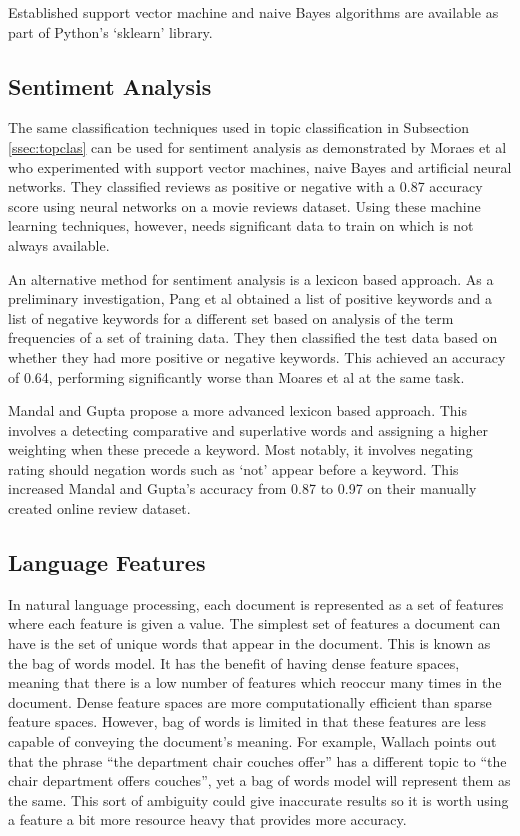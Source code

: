 			Established support vector machine and naive Bayes algorithms are available as part of Python's `sklearn' library.
		\subsection{Sentiment Analysis}
			The same classification techniques used in topic classification in Subsection \ref{ssec:topclas} can be used for sentiment analysis as demonstrated by Moraes et al who experimented with support vector machines, naive Bayes and artificial neural networks. They classified reviews as positive or negative with a 0.87 accuracy score using neural networks on a movie reviews dataset\cite{sentiment_ann_moares}. Using these machine learning techniques, however, needs significant data to train on which is not always available. 
			
			An alternative method for sentiment analysis is a lexicon based approach. As a preliminary investigation, Pang et al obtained a list of positive keywords and a list of negative keywords for a different set based on analysis of the term frequencies of a set of training data\cite{sentiment_ml_pang}. They then classified the test data based on whether they had more positive or negative keywords. This achieved an accuracy of 0.64, performing significantly worse than Moares et al at the same task.
			
			Mandal and Gupta propose a more advanced lexicon based approach\cite{lexicon_sentiments_mandal}. This involves a detecting comparative and superlative words and assigning a higher weighting when these precede a keyword. Most notably, it involves negating rating should negation words such as `not' appear before a keyword. This increased Mandal and Gupta's accuracy from 0.87 to 0.97 on their manually created online review dataset.			
		\subsection{Language Features}\label{sec:litrev-langfet}
			In natural language processing, each document is represented as a set of features where each feature is given a value. The simplest set of features a document can have is the set of unique words that appear in the document. This is known as the bag of words model. It has the benefit of having dense feature spaces, meaning that there is a low number of features which reoccur many times in the document. Dense feature spaces are more computationally efficient than sparse feature spaces. However, bag of words is limited in that these features are less capable of conveying the document's meaning. For example, Wallach points out that the phrase ``the department chair couches offer'' has a different topic to ``the chair department offers couches'', yet a bag of words model will represent them as the same\cite{beyond_bag_wallach}. This sort of ambiguity could give inaccurate results so it is worth using a feature a bit more resource heavy that provides more accuracy.  

